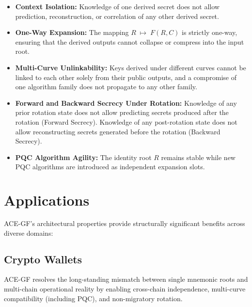 \documentclass[11pt,a4paper]{article}
\begin{document}
\begin{itemize}[noitemsep, nolistsep]
    \item \textbf{Context Isolation:} Knowledge of one derived secret does not allow prediction, reconstruction, or correlation of any other derived secret.
    \item \textbf{One-Way Expansion:} The mapping $R \;\mapsto\; F(R, C)$ is strictly one-way, ensuring that the derived outputs cannot collapse or compress into the input root.
    \item \textbf{Multi-Curve Unlinkability:} Keys derived under different curves cannot be linked to each other solely from their public outputs, and a compromise of one algorithm family does not propagate to any other family.
    \item \textbf{Forward and Backward Secrecy Under Rotation:} Knowledge of any prior rotation state does not allow predicting secrets produced after the rotation (Forward Secrecy). Knowledge of any post-rotation state does not allow reconstructing secrets generated before the rotation (Backward Secrecy).
    \item \textbf{PQC Algorithm Agility:} The identity root $R$ remains stable while new PQC algorithms are introduced as independent expansion slots.
\end{itemize}
\begin{figure}[htbp]
  \centering
\end{figure}

\section{Applications}
ACE-GF's architectural properties provide structurally significant benefits across diverse domains:

\subsection{Crypto Wallets}
ACE-GF resolves the long-standing mismatch between single mnemonic roots and multi-chain operational reality by enabling cross-chain independence, multi-curve compatibility (including PQC), and non-migratory rotation.
\end{document}
